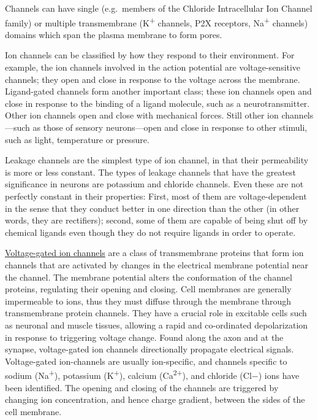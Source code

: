 Channels can have single (e.g.~members of the Chloride Intracellular Ion Channel family) or multiple transmembrane (K\textsuperscript{+} channels, P2X receptors, Na\textsuperscript{+} channels) domains which span the plasma membrane to form pores.

Ion channels can be classified by how they respond to their environment. For example, the ion channels involved in the action potential are voltage-sensitive channels; they open and close in response to the voltage across the membrane. Ligand-gated channels form another important class; these ion channels open and close in response to the binding of a ligand molecule, such as a neurotransmitter. Other ion channels open and close with mechanical forces. Still other ion channels---such as those of sensory neurons---open and close in response to other stimuli, such as light, temperature or pressure.

Leakage channels are the simplest type of ion channel, in that their permeability is more or less constant. The types of leakage channels that have the greatest significance in neurons are potassium and chloride channels. Even these are not perfectly constant in their properties: First, most of them are voltage-dependent in the sense that they conduct better in one direction than the other (in other words, they are rectifiers); second, some of them are capable of being shut off by chemical ligands even though they do not require ligands in order to operate.

\href{https://en.wikipedia.org/wiki/Voltage-gated_ion_channel}{Voltage-gated ion channels} are a class of transmembrane proteins that form ion channels that are activated by changes in the electrical membrane potential near the channel. The membrane potential alters the conformation of the channel proteins, regulating their opening and closing. Cell membranes are generally impermeable to ions, thus they must diffuse through the membrane through transmembrane protein channels. They have a crucial role in excitable cells such as neuronal and muscle tissues, allowing a rapid and co-ordinated depolarization in response to triggering voltage change. Found along the axon and at the synapse, voltage-gated ion channels directionally propagate electrical signals. Voltage-gated ion-channels are usually ion-specific, and channels specific to sodium (Na\textsuperscript{+}), potassium (K\textsuperscript{+}), calcium (Ca\textsuperscript{2+}), and chloride (Cl−) ions have been identified. The opening and closing of the channels are triggered by changing ion concentration, and hence charge gradient, between the sides of the cell membrane.

